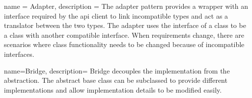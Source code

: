 

{
	name = {Adapter},
	description = {
		The adapter pattern provides a wrapper with an interface
		required by the \gls{api} client to link incompatible types and act as a
		translator between the two types. The adapter uses the interface
		of a class to be a class with another compatible interface. When
		requirements change, there are scenarios where class
		functionality needs to be changed because of incompatible
		interfaces.
	}
}

{
	name={Bridge},
	description={
			Bridge decouples the implementation from the abstraction. The
		abstract base class can be subclassed to provide different
		implementations and allow implementation details to be
		modified easily. 
	}
}

